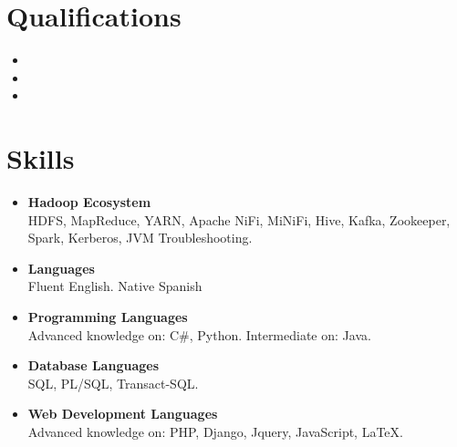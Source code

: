 \documentclass[11pt,a4paper,roman]{moderncv}        %
\begin{document}
\section{Qualifications}


\begin{itemize}
\item{}
\item{}
\item{}
\end{itemize}

\section{Skills}
\begin{itemize}
\item \textbf{Hadoop Ecosystem}\\HDFS, MapReduce, YARN, Apache NiFi, MiNiFi, Hive, Kafka, Zookeeper, Spark, Kerberos, JVM Troubleshooting.
\vspace{3pt}
\item \textbf{Languages} \\Fluent English. Native Spanish
\vspace{3pt}
\item \textbf{Programming Languages} \\Advanced knowledge on: C\#, Python. Intermediate on: Java.
\vspace{3pt}
\item \textbf{Database Languages} \\SQL, PL/SQL, Transact-SQL.
\vspace{3pt}
\item \textbf{Web Development Languages} \\Advanced knowledge on: PHP, Django, Jquery, JavaScript, \LaTeX.
\end{itemize}
\nocite{*}
\end{document}
